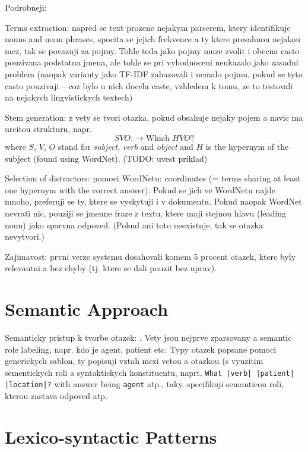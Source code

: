 \documentclass[a4paper, 12pt, twoside]{fithesis2}		%
\renewcommand{\_}{\leavevmode \kern0.0em\vbox{\hrule width0.4em}}
\begin{document}
Podrobneji:

Terms extraction: napred se text prozene nejakym parserem, ktery identifikuje nouns and noun phrases, spocita se jejich frekvence a ty ktere presahnou nejakou mez, tak se povazuji za pojmy. Tohle teda jako pojmy muze zvolit i obecna casto pouzivana podstatna jmena, ale tohle se pri vyhodnoceni neukazalo jako zasadni problem (naopak varianty jako TF-IDF zahazovali i nemalo pojmu, pokud se tyto casto pouzivaji -- coz bylo u nich docela caste, vzhledem k tomu, ze to testovali na nejakych lingvistickych textech)

Stem generation: z vety se tvori otazka, pokud obsahuje nejaky pojem a navic ma urcitou strukturu, napr.
$$
S V O \text{.} \longrightarrow \text{Which } H V O \text{?}
$$
where $S$, $V$, $O$ stand for \textit{subject}, \textit{verb} and \textit{object} and $H$ is the hypernym of the subject (found using WordNet). (TODO: uvest priklad)


Selection of distractors: pomoci WordNetu: coordinates (= terms sharing at least one hypernym with the correct answer). Pokud se jich ve WordNetu najde mnoho, preferuji se ty, ktere se vyskytuji i v dokumentu. Pokud naopak WordNet nevrati nic, pouziji se jmenne fraze z textu, ktere maji stejnou hlavu (leading noun) jako sparvna odpoved. (Pokud ani toto neexistuje, tak se otazka nevytvori.)

Zajimavost: prvni verze systemu dosahovali komem 5 procent otazek, ktere byly relevantni a bez chyby (tj. ktere se dali pouzit bez uprav).


\section{Semantic Approach}
\label{sec:questions-semantically}

Semanticky pristup k tvorbe otazek: \cite{questions-eval}.
Vety jsou nejprve zparsovany a semantic role labeling, napr. kdo je agent, patient etc.
Typy otazek popsane pomoci generickych sablon, ty popisuji vztah mezi vetou a otazkou (s vyuzitim sementickych roli a syntaktickych konstituentu, naprt. \texttt{What |verb| |patient| |location|?} with answer being \texttt{agent} atp., taky. specifikuji semanticou roli, kterou zastava odpoved atp.


\section{Lexico-syntactic Patterns}
\label{sec:lexico-syntactic-patterns}
\end{document}

